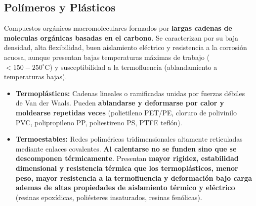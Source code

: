 \subsection{Polímeros y Plásticos}
Compuestos orgánicos macromoleculares formados por \textbf{largas cadenas de moleculas orgánicas basadas en el carbono}. Se caracterizan por su baja densidad, alta flexibilidad, buen aislamiento eléctrico y resistencia a la corrosión acuosa, aunque presentan bajas temperaturas máximas de trabajo ($<150 - 250^\circ\text{C}$) y susceptibilidad a la termofluencia (ablandamiento a temperaturas bajas).
\begin{itemize}
    \item \textbf{Termoplásticos:} Cadenas lineales o ramificadas unidas por fuerzas débiles de Van der Waals. Pueden \textbf{ablandarse y deformarse por calor y moldearse repetidas veces} (polietileno PET/PE, cloruro de polivinilo PVC, polipropileno PP, poliestireno PS, PTFE teflón).
    \item \textbf{Termoestables:} Redes poliméricas tridimensionales altamente reticuladas mediante enlaces covalentes. \textbf{Al calentarse no se funden sino que se descomponen térmicamente}. Presentan \textbf{mayor rigidez, estabilidad dimensional y resistencia térmica que los termoplásticos, menor peso, mayor resistencia a la termofluencia y deformación bajo carga ademas de altas propiedades de aislamiento térmico y eléctrico} (resinas epoxídicas, poliésteres insaturados, resinas fenólicas).
\end{itemize}

